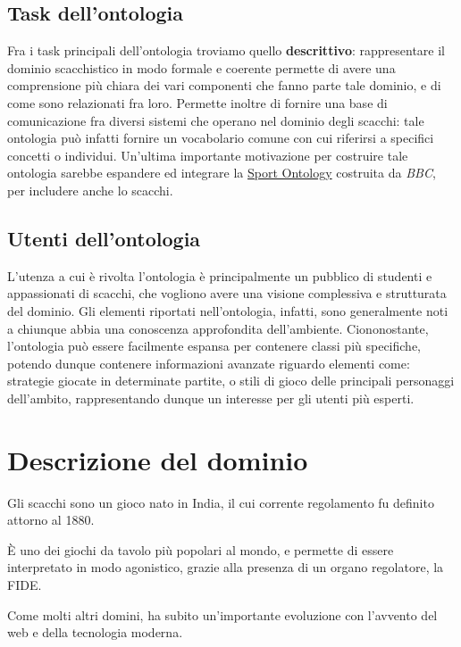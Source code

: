 \documentclass[12pt]{book}
\begin{document}
\section{Task dell'ontologia}

Fra i task principali dell'ontologia troviamo quello
\textbf{descrittivo}: rappresentare il dominio scacchistico in modo
formale e coerente permette di avere una comprensione più chiara dei
vari componenti che fanno parte tale dominio, e di come sono
relazionati fra loro. Permette inoltre di fornire una base di
comunicazione fra diversi sistemi che operano nel dominio degli
scacchi: tale ontologia può infatti fornire un vocabolario comune con
cui riferirsi a specifici concetti o individui. Un'ultima importante 
motivazione per costruire tale ontologia sarebbe espandere ed
integrare la 
\href{https://www.bbc.co.uk/ontologies/sport-ontology/}{Sport Ontology} costruita da \textit{BBC}, per includere anche
lo scacchi.


\section{Utenti dell'ontologia}

L'utenza a cui è rivolta l'ontologia è principalmente un pubblico di
studenti e appassionati di scacchi, che vogliono avere una visione
complessiva e strutturata del dominio. Gli elementi riportati nell'ontologia,
infatti, sono generalmente noti a chiunque abbia una conoscenza
approfondita dell'ambiente. Ciononostante, l'ontologia può essere
facilmente espansa per contenere classi più specifiche,
potendo dunque contenere informazioni avanzate riguardo
elementi come: strategie giocate in determinate partite, o stili di
gioco delle principali personaggi dell'ambito, rappresentando dunque
un interesse per gli utenti più esperti.

\chapter{Descrizione del dominio}

Gli scacchi sono un gioco nato in India, il cui corrente regolamento 
fu definito attorno al 1880. 

È uno dei giochi da tavolo più popolari al mondo,
e permette di essere interpretato in modo agonistico,
grazie alla presenza di un organo regolatore, la FIDE.

Come molti altri domini, ha subito un'importante evoluzione con l'avvento del web e
della tecnologia moderna.
\end{document}
